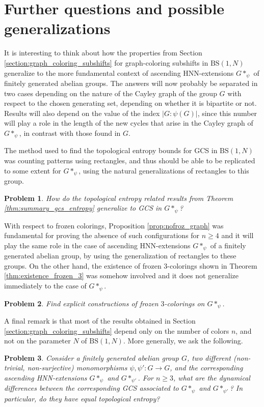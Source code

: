\documentclass[letterpaper,11pt,reqno]{amsart}
\theoremstyle{plain}
\newtheorem*{problem*}{Problem}
\theoremstyle{definition}
\newcommand{\BS}[1][N]{\mathrm{BS}(1,#1)}
\begin{document}
\section{Further questions and possible generalizations}
\label{section: further questions}

It is interesting to think about how the properties from Section \ref{section:graph_coloring_subshifts} for graph-coloring subshifts in $\BS$ generalize to the more fundamental context of ascending HNN-extensions $G*_{\psi}$ of finitely generated abelian groups. The answers will now probably be separated in two cases depending on the nature of the Cayley graph of the group $G$ with respect to the chosen generating set, depending on whether it is bipartite or not. Results will also depend on the value of the index $|G:\psi(G)|$, since this number will play a role in the length of the new cycles that arise in the Cayley graph of $G*_{\psi}$, in contrast with those found in $G$.

The method used to find the topological entropy bounds for GCS in $\BS$ was counting patterns using rectangles, and thus should be able to be replicated to some extent for $G*_{\psi}$, using the natural generalizations of rectangles to this group. 
\begin{problem*}
	How do the topological entropy related results from Theorem \ref{thm:summary_gcs_entropy} generalize to GCS in $G*_{\psi}$?
\end{problem*}
With respect to frozen colorings, Proposition \ref{prop:nofroz_graph} was fundamental for proving the absence of such configurations for $n\ge 4$ and it will play the same role in the case of ascending HNN-extensions $G*_{\psi}$ of a finitely generated abelian group, by using the generalization of rectangles to these groups. On the other hand, the existence of frozen $3$-colorings shown in Theorem \ref{thm:existence_frozen_3} was somehow involved and it does not generalize immediately to the case of $G*_{\psi}$.
\begin{problem*}
	Find explicit constructions of frozen $3$-colorings on $G*_{\psi}$.
\end{problem*}

A final remark is that most of the results obtained in Section \ref{section:graph_coloring_subshifts} depend only on the number of colors $n$, and not on the parameter $N$ of $\BS$. More generally, we ask the following.
\begin{problem*}
	Consider a finitely generated abelian group $G$, two different (non-trivial, non-surjective) monomorphisms $\psi, \psi':G\to G$, and the corresponding ascending HNN-extensions $G*_{\psi}$ and $G*_{\psi'}$. For $n\ge 3$, what are the dynamical differences between the corresponding GCS associated to $G*_{\psi}$ and $G*_{\psi'}$? In particular, do they have equal topological entropy?
\end{problem*}
\end{document}
